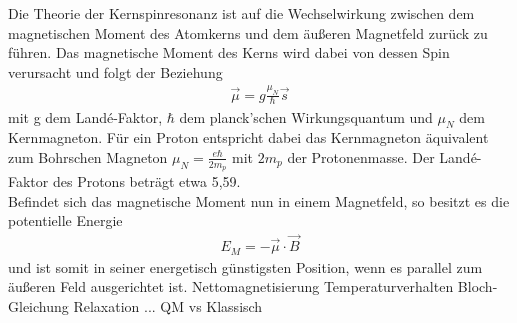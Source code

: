 \label{theorie}
Die Theorie der Kernspinresonanz ist auf die Wechselwirkung zwischen dem magnetischen Moment des Atomkerns und dem äußeren Magnetfeld zurück zu führen.
Das magnetische Moment des Kerns wird dabei von dessen Spin verursacht und folgt der Beziehung
\begin{align}
\vec{\mu}=g \frac{\mu_N}{\hbar}\vec{s}
\end{align}
mit g dem Landé-Faktor, $\hbar$ dem planck'schen Wirkungsquantum und $\mu_N$ dem Kernmagneton. Für ein Proton entspricht dabei das Kernmagneton äquivalent zum Bohrschen Magneton $\mu_N=\frac{e \hbar}{2m_p}$ mit $2m_p$ der Protonenmasse. Der Landé-Faktor des Protons beträgt etwa 5,59.\\
Befindet sich das magnetische Moment nun in einem Magnetfeld, so besitzt es die potentielle Energie 
\begin{align}
E_M=-\vec{\mu} \cdot \vec{B}
\end{align}
und ist somit in seiner energetisch günstigsten Position, wenn es parallel zum äußeren Feld ausgerichtet ist.
Nettomagnetisierung
Temperaturverhalten
Bloch-Gleichung
Relaxation
...
QM vs Klassisch

